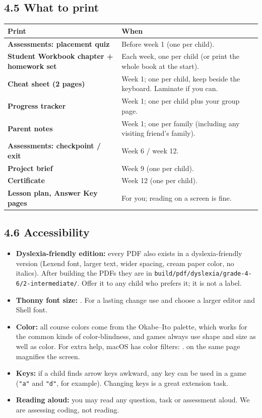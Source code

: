 \documentclass[level=2,teacher]{kidscode}
\begin{document}
\subsection{4.5 What to print}
\begin{tabularx}{\linewidth}{@{}>{\bfseries}p{4.8cm}X@{}}
\toprule
Print & When \\ \midrule
Assessments: placement quiz & Before week 1 (one per child). \\
Student Workbook chapter + homework set & Each week, one per child (or print the whole book at the start). \\
Cheat sheet (2 pages) & Week 1; one per child, keep beside the keyboard. Laminate if you can. \\
Progress tracker & Week 1; one per child plus your group page. \\
Parent notes & Week 1; one per family (including any visiting friend's family). \\
Assessments: checkpoint / exit & Week 6 / week 12. \\
Project brief & Week 9 (one per child). \\
Certificate & Week 12 (one per child). \\
Lesson plan, Answer Key pages & For you; reading on a screen is fine. \\
\bottomrule
\end{tabularx}

\subsection{4.6 Accessibility}
\begin{itemize}[itemsep=1pt]
  \item \textbf{Dyslexia-friendly edition:} every PDF also exists in a dyslexia-friendly version
        (Lexend font, larger text, wider spacing, cream paper color, no italics). After building
        the PDFs they are in \texttt{build/\allowbreak pdf/\allowbreak dyslexia/\allowbreak grade-4-6/2-intermediate/}. Offer it to any child
        who prefers it; it is not a label.
  \item \textbf{Thonny font size:} . For a lasting change use
         and choose a larger editor and Shell font.
  \item \textbf{Color:} all course colors come from the Okabe--Ito palette, which works for the
        common kinds of color-blindness, and games always use shape and size as well as color.
        For extra help, macOS has color filters: .  on the same page magnifies the screen.
  \item \textbf{Keys:} if a child finds arrow keys awkward, any key can be used in a game
        (\texttt{"a"} and \texttt{"d"}, for example). Changing keys is a great extension task.
  \item \textbf{Reading aloud:} you may read any question, task or assessment aloud. We are
        assessing coding, not reading.
\end{itemize}
\end{document}
